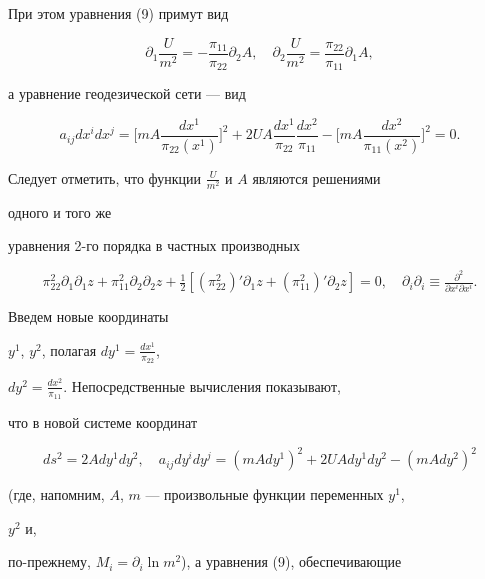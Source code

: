 При этом уравнения (9) примут вид 


$$ 


\partial_1\frac{U}{m^2}=-\frac{\pi_{11}}{\pi_{22}}\partial_2A,\quad 


\partial_2\frac{U}{m^2}=\frac{\pi_{22}}{\pi_{11}}\partial_1A, 


$$ 


а уравнение геодезической сети --- вид 


$$ 


a_{ij}dx^i dx^j=\bigg[m A\frac{dx^1}{\pi_{22}(x^1)}\bigg]^2+ 


2U A\frac{dx^1}{\pi_{22}}\frac{dx^2}{\pi_{11}}-\bigg[ 


m A\frac{dx^2}{\pi_{11}(x^2)}\bigg]^2=0.


$$ 


Следует отметить, что функции $\frac{U}{m^2}$ и $A$ являются решениями 


одного и того же 


уравнения 2-го порядка в частных производных 


$$ 


\pi^2_{22}\partial_1\partial_1 z+\pi^2_{11} 


\partial_2\partial_2 z+\tfrac{1}{2}[(\pi^2_{22})' 


\partial_1 z+(\pi^2_{11})'\partial_2 z]=0,\quad 


\partial_i\partial_i\equiv\tfrac{\partial^2} 


{\partial x^i\partial x^i}.


$$ 


Введем новые координаты 


$y^1$, $y^2$, полагая $dy^1=\frac{dx^1}{\pi_{22}}$, 


$dy^2=\frac{dx^2}{\pi_{11}}$. Непосредственные вычисления показывают, 


что в новой системе координат 


\begin{equation} 


ds^2=2A dy^1dy^2,\quad a_{ij}dy^i dy^j=(m A dy^1)^2+ 


2U A dy^1dy^2-(m A dy^2)^2 


\end{equation} 


(где, напомним, $A$, $m$ --- произвольные функции переменных $y^1$, 


$y^2$ и,


по-прежнему, $M_i=\partial_i\ln m^2$), а уравнения (9), обеспечивающие 


